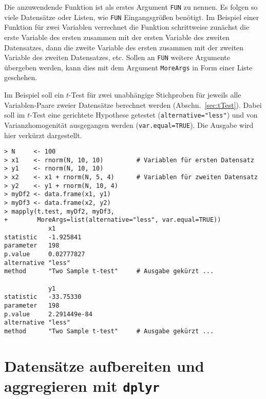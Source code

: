 Die anzuwendende Funktion ist als erstes Argument \lstinline!FUN! zu nennen. Es folgen so viele Datensätze oder Listen, wie \lstinline!FUN! Eingangsgrößen benötigt. Im Beispiel einer Funktion für zwei Variablen verrechnet die Funktion schrittweise zunächst die erste Variable des ersten zusammen mit der ersten Variable des zweiten Datensatzes, dann die zweite Variable des ersten zusammen mit der zweiten Variable des zweiten Datensatzes, etc. Sollen an \lstinline!FUN! weitere Argumente übergeben werden, kann dies mit dem Argument \lstinline!MoreArgs! in Form einer Liste geschehen.

Im Beispiel soll ein $t$-Test für zwei unabhängige Stichproben für jeweils alle Variablen-Paare zweier Datensätze berechnet werden (Abschn.\ \ref{sec:tTest}). Dabei soll im $t$-Test eine gerichtete Hypothese getestet (\lstinline!alternative="less"!) und von Varianzhomogenität ausgegangen werden (\lstinline!var.equal=TRUE!). Die Ausgabe wird hier verkürzt dargestellt.
\begin{lstlisting}
> N     <- 100
> x1    <- rnorm(N, 10, 10)         # Variablen für ersten Datensatz
> y1    <- rnorm(N, 10, 10)
> x2    <- x1 + rnorm(N, 5, 4)      # Variablen für zweiten Datensatz
> y2    <- y1 + rnorm(N, 10, 4)
> myDf2 <- data.frame(x1, y1)
> myDf3 <- data.frame(x2, y2)
> mapply(t.test, myDf2, myDf3,
+        MoreArgs=list(alternative="less", var.equal=TRUE))
            x1
statistic   -1.925841
parameter   198
p.value     0.02777827
alternative "less"
method      "Two Sample t-test"     # Ausgabe gekürzt ...

            y1
statistic   -33.75330
parameter   198
p.value     2.291449e-84
alternative "less"
method      "Two Sample t-test"     # Ausgabe gekürzt ...
\end{lstlisting}

\section{Datensätze aufbereiten und aggregieren mit \texttt{dplyr}}
\label{sec:dplyr}

